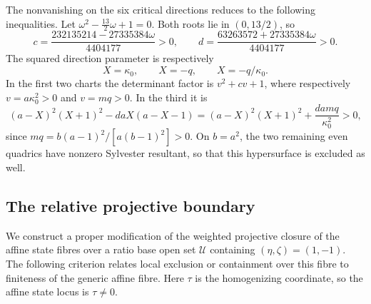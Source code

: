 \documentclass[11pt,a4paper]{article}
\numberwithin{equation}{section}
\theoremstyle{plain}
\theoremstyle{definition}
\theoremstyle{remark}
\begin{document}
The nonvanishing on the six critical directions reduces to the
following inequalities. Let $\omega^2-\tfrac{13}{2}\omega+1=0$.
Both roots lie in $(0,13/2)$, so
\[
 c=\frac{232135214-27335384\omega}{4404177}>0,\qquad
 d=\frac{63263572+27335384\omega}{4404177}>0.
\]
The squared direction parameter is respectively
\[
 X=\kappa_0,\qquad X=-q,\qquad X=-q/\kappa_0.
\]
In the first two charts the determinant factor is $v^2+cv+1$,
where respectively $v=a\kappa_0^2>0$ and $v=mq>0$.
In the third it is
\[
 (a-X)^2(X+1)^2-daX(a-X-1)
  =(a-X)^2(X+1)^2+\frac{damq}{\kappa_0^2}>0,
\]
since $mq=b(a-1)^2/[a(b-1)^2]>0$.
On $b=a^2$, the two remaining even quadrics have nonzero
Sylvester resultant, so that this hypersurface is excluded as well.

\subsection{The relative projective boundary}\label{r3:atlas}
We construct a proper modification of the weighted projective
closure of the affine state fibres over a ratio base open set
$\mathscr U$ containing $(\eta,\zeta)=(1,-1)$.
The following criterion relates local exclusion or containment
over this fibre to finiteness of the generic affine fibre.
Here $\tau$ is the homogenizing coordinate, so the affine state locus
is $\tau\ne0$.
\end{document}
